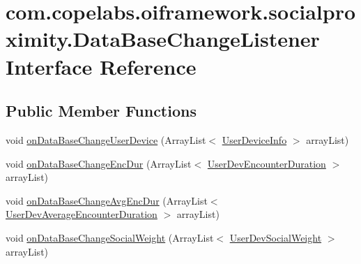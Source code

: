 \hypertarget{interfacecom_1_1copelabs_1_1oiframework_1_1socialproximity_1_1_data_base_change_listener}{}\section{com.\+copelabs.\+oiframework.\+socialproximity.\+Data\+Base\+Change\+Listener Interface Reference}
\label{interfacecom_1_1copelabs_1_1oiframework_1_1socialproximity_1_1_data_base_change_listener}
\subsection*{Public Member Functions}
\begin{DoxyCompactItemize}
\item 
void \hyperlink{interfacecom_1_1copelabs_1_1oiframework_1_1socialproximity_1_1_data_base_change_listener_a66e8e8ce4514c025164dcd0f9ac900d0}{on\+Data\+Base\+Change\+User\+Device} (Array\+List$<$ \hyperlink{classcom_1_1copelabs_1_1oiframework_1_1socialproximity_1_1_user_device_info}{User\+Device\+Info} $>$ array\+List)
\item 
void \hyperlink{interfacecom_1_1copelabs_1_1oiframework_1_1socialproximity_1_1_data_base_change_listener_a554a19cb262a4ff42df86acca644977c}{on\+Data\+Base\+Change\+Enc\+Dur} (Array\+List$<$ \hyperlink{classcom_1_1copelabs_1_1oiframework_1_1socialproximity_1_1_user_dev_encounter_duration}{User\+Dev\+Encounter\+Duration} $>$ array\+List)
\item 
void \hyperlink{interfacecom_1_1copelabs_1_1oiframework_1_1socialproximity_1_1_data_base_change_listener_a2b6839ee30247b9e75a748910f3d51c2}{on\+Data\+Base\+Change\+Avg\+Enc\+Dur} (Array\+List$<$ \hyperlink{classcom_1_1copelabs_1_1oiframework_1_1socialproximity_1_1_user_dev_average_encounter_duration}{User\+Dev\+Average\+Encounter\+Duration} $>$ array\+List)
\item 
void \hyperlink{interfacecom_1_1copelabs_1_1oiframework_1_1socialproximity_1_1_data_base_change_listener_a86e97d1c0d2d3899c0585f2cb435b814}{on\+Data\+Base\+Change\+Social\+Weight} (Array\+List$<$ \hyperlink{classcom_1_1copelabs_1_1oiframework_1_1socialproximity_1_1_user_dev_social_weight}{User\+Dev\+Social\+Weight} $>$ array\+List)
\end{DoxyCompactItemize}


